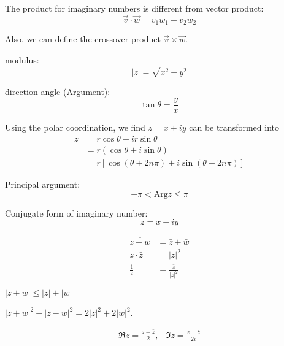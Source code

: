 The product for imaginary numbers is different from vector product:
\[
\vec v\cdot\vec w = v_1w_1+v_2w_2
\]

Also, we can define the crossover product $\vec v\times\vec w$.

modulus:
\[
|z| = \sqrt{x^2+y^2}
\]

direction angle (Argument):
\[
\tan\theta=\frac{y}{x}
\]

Using the polar coordination, we find $z=x+iy$ can be transformed into
\begin{align*}
z&=r\cos\theta+ir\sin\theta\\
&=r(\cos\theta+i\sin\theta)\\
&=r\left[\cos(\theta+2n\pi) + i\sin(\theta+2n\pi)\right]
\end{align*}

Principal argument:
\[
-\pi<\mbox{Arg}z\le\pi
\]

Conjugate form of imaginary number:
\[
\bar z = x-iy
\]

\begin{align*}
\overline{z+w} &=\bar z + \bar w\\
z\cdot\bar z&=|z|^2\\
\frac{1}{z}&=\frac{\bar z}{|z|^2}
\end{align*}
\begin{proposition}
$|z+w|\le|z|+|w|$
\end{proposition}
\begin{proposition}
$|z+w|^2+|z-w|^2=2|z|^2+2|w|^2$.
\end{proposition}
\begin{proposition}
\begin{eqnarray*}
\Re z=\frac{z+\bar z}{2},
&
\Im z=\frac{z-\bar z}{2i}
\end{eqnarray*}
\end{proposition}


















